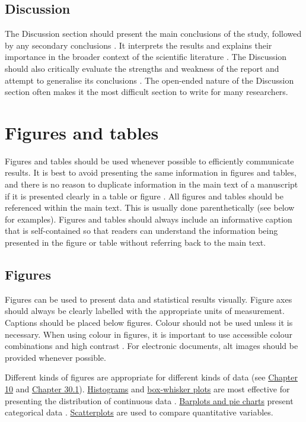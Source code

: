 \documentclass[
]{scrbook}
\begin{document}
\hypertarget{discussion}{%
\subsection{Discussion}\label{discussion}}

The Discussion section should present the main conclusions of the study, followed by any secondary conclusions \citep{Woodford1999}.
It interprets the results and explains their importance in the broader context of the scientific literature \citep{Turbek2016}.
The Discussion should also critically evaluate the strengths and weakness of the report and attempt to generalise its conclusions \citep{Turbek2016}.
The open-ended nature of the Discussion section often makes it the most difficult section to write for many researchers.

\hypertarget{figures-and-tables}{%
\section{Figures and tables}\label{figures-and-tables}}

Figures and tables should be used whenever possible to efficiently communicate results.
It is best to avoid presenting the same information in figures and tables, and there is no reason to duplicate information in the main text of a manuscript if it is presented clearly in a table or figure \citep{Lang1997}.
All figures and tables should be referenced within the main text.
This is usually done parenthetically (see below for examples).
Figures and tables should always include an informative caption that is self-contained so that readers can understand the information being presented in the figure or table without referring back to the main text.

\hypertarget{figures}{%
\subsection{Figures}\label{figures}}

Figures can be used to present data and statistical results visually.
Figure axes should always be clearly labelled with the appropriate units of measurement.
Captions should be placed below figures.
Colour should not be used unless it is necessary.
When using colour in figures, it is important to use accessible colour combinations and high contrast \citep{Jambor2021, Painter2021}.
For electronic documents, alt images should be provided whenever possible.

Different kinds of figures are appropriate for different kinds of data (see \protect\hyperlink{Chapter_10}{Chapter 10} and \protect\hyperlink{scatterplots}{Chapter 30.1}).
\protect\hyperlink{histograms}{Histograms} and \protect\hyperlink{box-whisker-plots}{box-whisker plots} are most effective for presenting the distribution of continuous data \citep{Lang1997, Weissgerber2015}.
\protect\hyperlink{barplots-and-pie-charts}{Barplots and pie charts} present categorical data \citep{Lang1997, Weissgerber2015}.
\protect\hyperlink{scatterplots}{Scatterplots} are used to compare quantitative variables.
\end{document}
